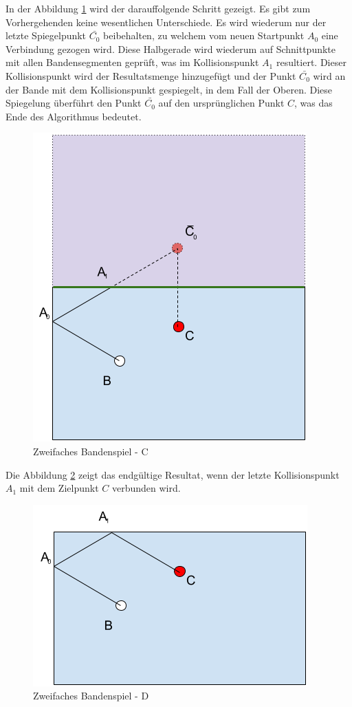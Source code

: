 In der Abbildung \ref{fig:zweifaches_bandenspiel_c} wird der darauffolgende Schritt gezeigt. Es gibt zum Vorhergehenden
keine wesentlichen Unterschiede. Es wird wiederum nur der letzte Spiegelpunkt $\bar{C_0}$ beibehalten, zu welchem vom
neuen Startpunkt $A_0$ eine Verbindung gezogen wird. Diese Halbgerade wird wiederum auf Schnittpunkte mit allen
Bandensegmenten geprüft, was im Kollisionspunkt $A_1$ resultiert. Dieser Kollisionspunkt wird der Resultatsmenge
hinzugefügt und der Punkt $\bar{C_0}$ wird an der Bande mit dem Kollisionspunkt gespiegelt, in dem Fall der Oberen.
Diese Spiegelung überführt den Punkt $\bar{C_0}$ auf den ursprünglichen Punkt $C$, was das Ende des Algorithmus
bedeutet.
\begin{figure}[h!]
    \begin{center}
        \includegraphics[width=0.5\linewidth]{../common/03_billiard_ai/resources/52_rail_reflection_2_c.png}
    \end{center}
    \caption{Zweifaches Bandenspiel - C}
    \label{fig:zweifaches_bandenspiel_c}
\end{figure}

\newpage
Die Abbildung \ref{fig:zweifaches_bandenspiel_d} zeigt das endgültige Resultat, wenn der letzte Kollisionspunkt $A_1$
mit dem Zielpunkt $C$ verbunden wird.
\begin{figure}[h!]
    \begin{center}
        \includegraphics[width=0.5\linewidth]{../common/03_billiard_ai/resources/53_rail_reflection_2_d.png}
    \end{center}
    \caption{Zweifaches Bandenspiel - D}
    \label{fig:zweifaches_bandenspiel_d}
\end{figure}

